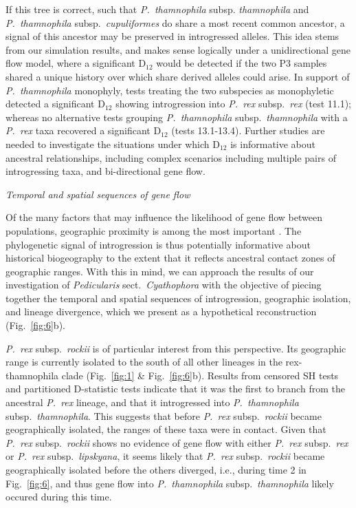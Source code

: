 \documentclass[12pt,letterpaper]{article}
\renewcommand{\subsection}[1]{%
\bigskip
\begin{center}
\begin{large}
\normalfont\itshape #1
\end{large}
\end{center}}
\begin{document}
If this tree is correct, such that \emph{P.~thamnophila} subsp.
\emph{thamnophila} and \emph{P.~thamnophila} subsp.\
\emph{cupuliformes} do share a most recent common ancestor, a
signal of this ancestor may be preserved in introgressed alleles.
This idea stems from our simulation results, and makes sense logically
under a unidirectional gene flow model, where a significant D$_{12}$
would be detected if the two P3 samples shared a unique history
over which share derived alleles could arise.  In support of
\emph{P.~thamnophila} monophyly, tests treating the two subspecies as
monophyletic detected a significant D$_{12}$ showing introgression
into \emph{P.~rex} subsp.\ \emph{rex} (test 11.1); whereas no
alternative tests grouping \emph{P.~thamnophila} subsp.\
\emph{thamnophila} with a \emph{P.~rex} taxa recovered a significant
D$_{12}$ (tests 13.1-13.4).  Further studies are needed to investigate
the situations under which D$_{12}$ is informative about ancestral
relationships, including complex scenarios including multiple
pairs of introgressing taxa, and bi-directional gene flow.

\subsection{Temporal and spatial sequences of gene flow}
Of the many factors that may influence the likelihood of gene flow
between populations, geographic proximity is among the most important
\citep{jenkins_meta-analysis_2010}. The phylogenetic signal of
introgression is thus potentially informative about historical biogeography
to the extent that it reflects ancestral contact zones of geographic
ranges. With this in mind, we can approach the results of our
investigation of \emph{Pedicularis} sect.\ \emph{Cyathophora} with the
objective of piecing together the temporal and spatial sequences of
introgression, geographic isolation, and lineage divergence, which we
present as a hypothetical reconstruction (Fig.~\ref{fig:6}b).

\emph{P.~rex} subsp.\ \emph{rockii} is of particular interest from
this perspective. Its geographic range is currently isolated to the
south of all other lineages in the rex-thamnophila clade
(Fig.~\ref{fig:1} \& Fig.~\ref{fig:6}b). Results from censored SH
tests and partitioned D-statistic tests indicate that it was the first
to branch from the ancestral \emph{P.~rex} lineage, and that it
introgressed into \emph{P.~thamnophila} subsp.\
\emph{thamnophila}. This suggests that before \emph{P.~rex} subsp.\
\emph{rockii} became geographically isolated, the ranges of these taxa
were in contact. Given that \emph{P.~rex} subsp.\ \emph{rockii} shows
no evidence of gene flow with either \emph{P.~rex} subsp.\ \emph{rex}
or \emph{P.~rex} subsp.\ \emph{lipskyana}, it seems likely that
\emph{P.~rex} subsp.\ \emph{rockii} became geographically isolated
before the others diverged, i.e., during time 2 in
Fig.~\ref{fig:6}, and thus gene flow into \emph{P.~thamnophila}
subsp.\ \emph{thamnophila} likely occured during this time.
\end{document}
